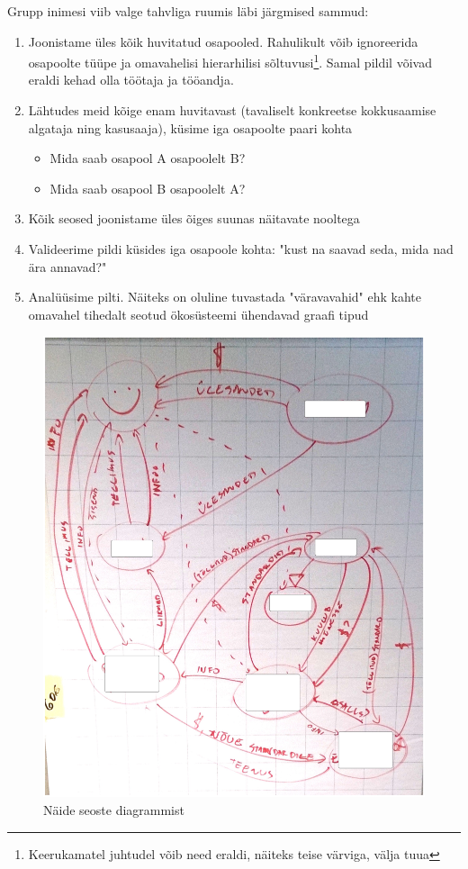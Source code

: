 \documentclass{article}
\begin{document}
Grupp inimesi viib valge tahvliga ruumis läbi järgmised sammud:
\begin{enumerate}
	\item Joonistame üles kõik huvitatud osapooled. Rahulikult võib ignoreerida osapoolte tüüpe ja omavahelisi hierarhilisi sõltuvusi\footnote{Keerukamatel juhtudel võib need eraldi, näiteks teise värviga, välja tuua}. Samal pildil võivad eraldi kehad olla töötaja ja tööandja. 
	\item Lähtudes meid kõige enam huvitavast (tavaliselt konkreetse kokkusaamise algataja ning kasusaaja), küsime iga osapoolte paari kohta
		\begin{itemize}
			\item Mida saab osapool A osapoolelt B?
			\item Mida saab osapool B osapoolelt A?
		\end{itemize}
	\item Kõik seosed joonistame üles õiges suunas näitavate nooltega 
	\item Valideerime pildi küsides iga osapoole kohta: "kust na saavad seda, mida nad ära annavad?"
	\item Analüüsime pilti. Näiteks on oluline tuvastada "väravavahid" ehk kahte omavahel tihedalt seotud ökosüsteemi ühendavad graafi tipud
\end{enumerate}

\begin{figure}[h]
	\begin{center}
		\includegraphics[width=.7\textwidth]{seosed.jpg}
		\caption{Näide seoste diagrammist}
		\label{fig:seosed}
	\end{center}
\end{figure}
\end{document}
